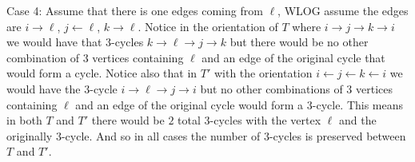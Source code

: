 \documentclass[12pt]{amsart}
\theoremstyle{definition}
\newcommand{\ra}{\rightarrow}
\begin{document}
\begin{itemize}
Case 4: Assume that there is one edges coming from $\ell$, WLOG assume the edges are $i\ra \ell$, $j\leftarrow \ell$, $k\ra \ell$. Notice in the orientation of $T$ where $i\ra j\ra k\ra i$ we would have that $3$-cycles $k\ra \ell\ra j\ra k$ but there would be no other combination of $3$ vertices containing $\ell$ and an edge of the original cycle that would form a cycle. Notice also that in $T'$ with the orientation $i\leftarrow j \leftarrow k \leftarrow i$ we would have the $3$-cycle $i\ra \ell \ra j \ra i$ but no other combinations of $3$ vertices containing $\ell$ and an edge of the original cycle would form a $3$-cycle. This means in both $T$ and $T'$ there would be $2$ total $3$-cycles with the vertex $\ell$ and the originally $3$-cycle. And so in all cases the number of $3$-cycles is preserved between $T$ and $T'$.\\


\end{itemize}
\end{document}
